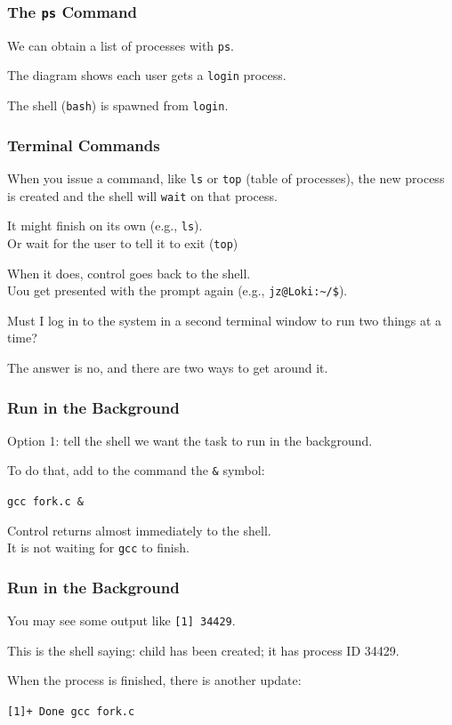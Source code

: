 \begin{frame}
\frametitle{The \texttt{ps} Command}

We can obtain a list of processes with \texttt{ps}.

The diagram shows each user gets a \texttt{login} process.

The shell (\texttt{bash}) is spawned from \texttt{login}.

\end{frame}

\begin{frame}
\frametitle{Terminal Commands}

When you issue a command, like \texttt{ls} or \texttt{top} (table of processes), the new process is created and the shell will \texttt{wait} on that process.

It might finish on its own (e.g., \texttt{ls}).\\
\quad Or wait for the user to tell it to exit (\texttt{top})

When it does, control goes back to the shell.\\
\quad Uou get presented with the prompt again (e.g., \texttt{jz@Loki:\~{}/\$}).

Must I log in to the system in a second terminal window to run two things at a time? 

The answer is no, and there are two ways to get around it.

\end{frame}

\begin{frame}
\frametitle{Run in the Background}

Option 1: tell the shell we want the task to run in the background. 

To do that, add to the command the \texttt{\&} symbol: 

\texttt{gcc fork.c \&}

Control returns almost immediately to the shell.\\
\quad It is not waiting for \texttt{gcc} to finish.

\end{frame}

\begin{frame}
\frametitle{Run in the Background}

 You may see some output like \texttt{[1] 34429}.
 
This is the shell saying: child has been created; it has process ID 34429. 

When the process is finished, there is another update:

\texttt{[1]+  Done                    gcc fork.c}

\end{frame}

